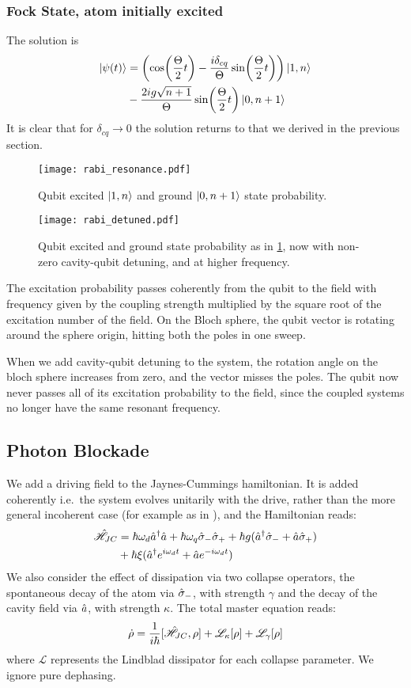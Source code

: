 \subsubsection{Fock State, atom initially excited}
The solution is 
\begin{align*}
  \ket{\psi(t)} &= \left(\cos(\frac{\Theta}{2}t)-\frac{i\delta_{cq}}{\Theta}\sin(\frac{\Theta}{2}t) \right)\ket{1, n} \\
                &-\frac{2ig\sqrt{n+1}}{\Theta}\sin(\frac{\Theta}{2}t)\ket{0, n+1}
\end{align*}
It is clear that for $\delta_{cq} \rightarrow 0$ the solution returns to that we derived in the previous section. 
\begin{figure}[h]
  \texttt{[image: rabi\_resonance.pdf]}
  \caption{Qubit excited $\ket{1, n}$ and ground $\ket{0, n+1}$ state probability.}
  \label{rabi_resonance}
\end{figure}
\begin{figure}[h]
  \texttt{[image: rabi\_detuned.pdf]}
  \caption{Qubit excited and ground state probability as in \cref{rabi_resonance}, now with non-zero cavity-qubit detuning, and at higher frequency.}
  \label{rabi_detuning}
\end{figure}
The excitation probability passes coherently from the qubit to the field with frequency given by the coupling strength multiplied by the square root of the excitation number of the field.
On the Bloch sphere, the qubit vector is rotating around the sphere origin, hitting both the poles in one sweep. 

When we add cavity-qubit detuning to the system, the rotation angle on the bloch sphere increases from zero, and the vector misses the poles. 
The qubit now never passes all of its excitation probability to the field, since the coupled systems no longer have the same resonant frequency. 
\subsection{Photon Blockade}
We add a driving field to the Jaynes-Cummings hamiltonian. It is added coherently i.e.\ the system evolves unitarily with the drive, rather than the more general incoherent case (for example as in \cite{Xu2014}), and the Hamiltonian reads:
\begin{align}
    \hat{\mathscr{H}}_{JC} &= \hbar \omega_d {\hat{a}^\dagger} \hat{a} + \hbar \omega_q \hat{\sigma}_- \hat{\sigma}_+ +\hbar g ({\hat{a}^\dagger} \hat{\sigma}_-+ \hat{a} \hat{\sigma}_+)\\
    & + \hbar \xi ({\hat{a}^\dagger} e^{i\omega_d t} + \hat{a} e^{-i\omega_d t})
\end{align}
We also consider the effect of dissipation via two collapse operators, the spontaneous decay of the atom via $\hat{\sigma}_-$, with strength $\gamma$ and the decay of the cavity field via $\hat{a}$, with strength $\kappa$. The total master equation reads:
\begin{equation}
  \dot{\rho} = \frac{1}{i\hbar}[\hat{\mathscr{H}}_{JC}, \rho] + \mathscr{L}_\kappa[\rho] + \mathscr{L}_\gamma[\rho]
\end{equation}
where $\mathscr{L}$ represents the Lindblad dissipator for each collapse parameter. 
We ignore pure dephasing.

